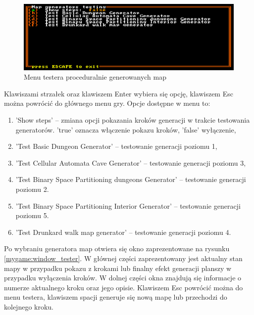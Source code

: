 \documentclass[12pt,twoside]{article}
\begin{document}
\FloatBarrier
\begin{figure}[ht]
	\centering
	\includegraphics[width=14cm]{images/mygame/gen_test.png}
	\caption{Menu testera proceduralnie generowanych map}
	\label{mygame:gen_test}
\end{figure}
\FloatBarrier

Klawiszami strzałek oraz klawiszem Enter wybiera się opcję, klawiszem Esc można powrócić do głównego menu gry. Opcje dostępne w menu to:

\begin{enumerate}[label=\alph*), leftmargin=1.25cm]
	\item 'Show steps' -- zmiana opcji pokazania kroków generacji w trakcie testowania generatorów. 'true' oznacza włączenie pokazu kroków, 'false' wyłączenie,
	\item 'Test Basic Dungeon Generator' -- testowanie generacji poziomu 1,			
	\item 'Test Cellular Automata Cave Generator' -- testowanie generacji poziomu 3,
	\item 'Test Binary Space Partitioning dungeons Generator' -- testowanie generacji poziomu 2.
	\item 'Test Binary Space Partitioning Interior Generator' -- testowanie generacji poziomu 5.
	\item 'Test Drunkard walk map generator' -- testowanie generacji poziomu 4.
\end{enumerate}

Po wybraniu generatora map otwiera się okno zaprezentowane na rysunku \ref{mygame:window_tester}. W głównej części zaprezentowany jest aktualny stan mapy w przypadku pokazu z krokami lub finalny efekt generacji planszy w przypadku wyłączenia kroków. W dolnej części okna znajdują się informacje o numerze aktualnego kroku oraz jego opisie. Klawiszem Esc powrócić można do menu testera, klawiszem spacji generuje się nową mapę lub przechodzi do kolejnego kroku.
\end{document}
